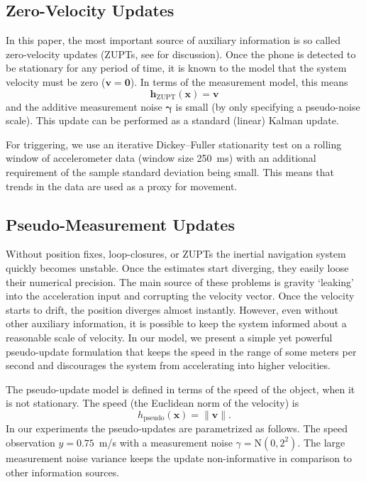 \documentclass[conference]{ieeetran}
\providecommand{\norm}[1]{\|#1\|}
\newcommand{\N}{\mathrm{N}}
\newcommand{\mbf}[1]{\mathbf{#1}}
\newcommand{\vect}[1]{\mbf{#1}}
\newcommand{\vectb}[1]{\bm{#1}}
\begin{document}
\subsection{Zero-Velocity Updates}
\noindent
In this paper, the most important source of auxiliary information is so called zero-velocity updates (ZUPTs, see \cite{Nilsson+Zachariah+Skog+Handel:2013} for discussion). Once the phone is detected to be stationary for any period of time, it is known to the model that the system velocity must be zero ($\vect{v}=\vect{0}$). In terms of the measurement model, this means
\begin{equation}
  \vect{h}_\mathrm{ZUPT}(\vect{x}) = \vect{v}
\end{equation}
and the additive measurement noise $\vectb{\gamma}$ is small (by only specifying a pseudo-noise scale). This update can be performed as a standard (linear) Kalman update.

For triggering, we use an iterative Dickey--Fuller stationarity test \cite{Dickey+Fuller:1979} on a rolling window of accelerometer data (window size 250~ms) with an additional requirement of the sample standard deviation being small. This means that trends in the data are used as a proxy for movement.

\subsection{Pseudo-Measurement Updates}
\noindent
Without position fixes, loop-closures, or ZUPTs the inertial navigation system quickly becomes unstable. Once the estimates start diverging, they easily loose their numerical precision. The main source of these problems is gravity `leaking' into the acceleration input and corrupting the velocity vector. Once the velocity starts to drift, the position diverges almost instantly.
However, even without other auxiliary information, it is possible to keep the system informed about a reasonable scale of velocity. In our model, we present a simple yet powerful pseudo-update formulation that keeps the speed in the range of some meters per second and discourages the system from accelerating into higher velocities.

The pseudo-update model is defined in terms of the speed of the object, when it is not stationary. The speed (the Euclidean norm of the velocity) is
\begin{equation}
  h_\mathrm{pseudo}(\vect{x}) = \norm{\vect{v}}.
\end{equation}
In our experiments the pseudo-updates are parametrized as follows. The speed observation $y = 0.75$~m/s with a measurement noise $\gamma = \N(0,2^2)$. The large measurement noise variance keeps the update non-informative in comparison to other information sources.
\end{document}
